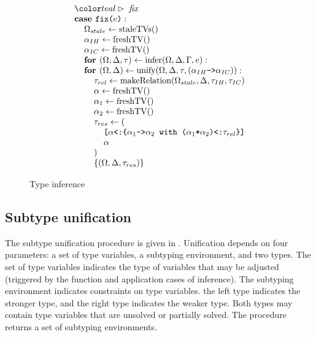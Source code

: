 \documentclass[acmsmall]{acmart}
\begin{document}
\begin{figure*}[h]
\[\begin{array}[t]{@{} l}
    \\

    \I \C{fix}
    \\
    \I \B{case } \code{fix($e$)} :  
    \\
    \I\I \Omega_{stale} \leftarrow \F{staleTVs}()
    \\
    \I\I \alpha_{IH} \leftarrow \F{freshTV}()
    \\
    \I\I \alpha_{IC} \leftarrow \F{freshTV}()
    \\
    \I\I \B{for } (\Omega, \Delta, \tau) \leftarrow \F{infer}(\Omega, \Delta, \Gamma, e):
    \\
    \I\I \B{for } (\Omega, \Delta) \leftarrow \F{unify}(\Omega, \Delta, \tau, (\code{$\alpha_{IH}$->$\alpha_{IC}$})): 
    \\
    \I\I\I \tau_{rel} \leftarrow \F{makeRelation}(\Omega_{stale}, \Delta, \tau_{IH}, \tau_{IC})
    \\
    \I\I\I \alpha \leftarrow \F{freshTV}()
    \\
    \I\I\I \alpha_1 \leftarrow \F{freshTV}()
    \\
    \I\I\I \alpha_2 \leftarrow \F{freshTV}()
    \\
    \I\I\I \tau_{res} \leftarrow (
    \\
    \I\I\I\I \code{[$\alpha$<:\{$\alpha_1$->$\alpha_2$ with ($\alpha_1$*$\alpha_2$)<:$\tau_{rel}$\}] }
    \\
    \I\I\I\I \alpha
    \\
    \I\I\I )
    \\
    \I\I\I \{(\Omega, \Delta, \tau_{res})\}

\end{array}
\]
\caption{Type inference}
\label{fig:infer}
\end{figure*}


\subsection{Subtype unification}
The subtype unification procedure is given in .
Unification depends on four parameters: a set of type variables, a subtyping environment, and two types.
The set of type variables indicates the type of variables that may be adjusted 
(triggered by the function and application cases of inference). 
The subtyping environment indicates constraints on type variables.
the left type indicates the stronger type, and the right type indicates the weaker type.
Both types may contain type variables that are unsolved or partially solved.
The procedure returns a set of subtyping environments.
\end{document}
